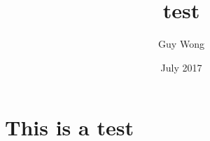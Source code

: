 \documentclass{article}
\title{test}
\author{Guy Wong}
\date{July 2017}
\begin{document}
\maketitle

\section{This is a test}
\end{document}
